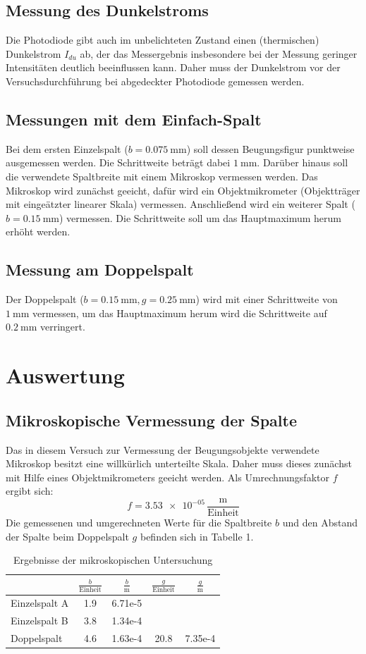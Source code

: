 \documentclass[11pt,ngerman,a4paper]{article}
\begin{document}
\subsection{Messung des Dunkelstroms}
Die Photodiode gibt auch im unbelichteten Zustand einen (thermischen) Dunkelstrom $I_{du}$ ab, der das Messergebnis insbesondere bei der Messung geringer Intensitäten deutlich beeinflussen kann. Daher muss der Dunkelstrom vor der Versuchsdurchführung bei abgedeckter Photodiode gemessen werden.
\subsection{Messungen mit dem Einfach-Spalt}
Bei dem ersten Einzelspalt ($b=\SI{0.075}{\milli \meter}$) soll dessen Beugungsfigur punktweise ausgemessen werden. Die Schrittweite beträgt dabei $\SI{1}{\milli \meter}$. Darüber hinaus soll die verwendete Spaltbreite mit einem Mikroskop vermessen werden. Das Mikroskop wird zunächst geeicht, dafür wird ein Objektmikrometer (Objektträger mit eingeätzter linearer Skala) vermessen.
\newline
Anschließend wird ein weiterer Spalt ($b=\SI{0.15}{\milli \meter}$) vermessen. Die Schrittweite soll um das Hauptmaximum herum erhöht werden.
\subsection{Messung am Doppelspalt}
Der Doppelspalt ($b=\SI{0.15}{\milli \meter}, g=\SI{0.25}{\milli \meter}$) wird mit einer Schrittweite von $\SI{1}{\milli \meter}$ vermessen, um das Hauptmaximum herum wird die Schrittweite auf $\SI{0.2}{\milli \meter}$ verringert.
\section{Auswertung}
\subsection{Mikroskopische Vermessung der Spalte}
Das in diesem Versuch zur Vermessung der Beugungsobjekte verwendete Mikroskop besitzt eine willkürlich unterteilte Skala. Daher muss dieses zunächst mit Hilfe eines Objektmikrometers geeicht werden. Als Umrechnungsfaktor $f$ ergibt sich:
\[
f = \num{3.53e-05}\,\frac{\si{\meter}}{\mathrm{Einheit}}
\]
Die gemessenen und umgerechneten Werte für die Spaltbreite $b$ und den Abstand der Spalte beim Doppelspalt $g$ befinden sich in Tabelle 1.
\begin{table}[H]
\centering
\begin{tabular}{lSSSS}

\toprule
&$\frac{b}{\mathrm{Einheit}}$ & $\frac{b}{\si{\meter}}$ & $\frac{g}{\mathrm{Einheit}}$ &$\frac{g}{\si{\meter}}$\\
\midrule
Einzelspalt A & 1.9  &6.71e-5 & &\\
Einzelspalt B & 3.8  &1.34e-4 &&\\
Doppelspalt   & 4.6  & 1.63e-4&20.8&7.35e-4\\
\bottomrule
\end{tabular}
\caption{Ergebnisse der mikroskopischen Untersuchung}
\end{table}
\end{document}

